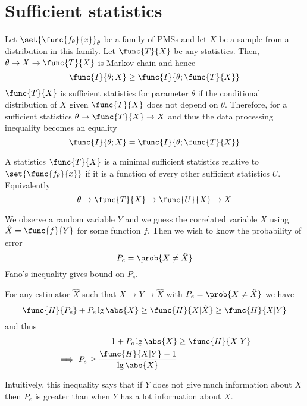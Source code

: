  \section{Sufficient statistics}
 Let \(\set{\func{f_\theta}{x}}_{\theta}\) be a family of PMSs and let \(X\) be a sample from a distribution in this family. Let \(\func{T}{X}\) be any statistics. Then, \(\theta \to X \to \func{T}{X}\) is Markov chain and hence 
 \begin{equation*}
       \func{I}{\theta; X} \geq \func{I}{\theta; \func{T}{X}}
 \end{equation*}
 \(\func{T}{X}\) is sufficient statistics for parameter \(\theta\) if the conditional distribution of \(X\) given \(\func{T}{X}\) does not depend on \(\theta\). Therefore, for a sufficient statistics \(\theta \to \func{T}{X} \to X\) and thus the data processing inequality becomes an equality 
 \begin{equation*}
       \func{I}{\theta ; X} = \func{I}{\theta ; \func{T}{X}}
 \end{equation*}

 A statistics \(\func{T}{X}\) is a minimal sufficient statistics relative to \(\set{\func{f_\theta}{x}}\) if it is a function of every other sufficient statistics \(U\). Equivalently 
 \begin{equation*}
       \theta \to \func{T}{X} \to \func{U}{X} \to X
 \end{equation*}

 We observe a random variable \(Y\) and we guess the correlated variable \(X\) using \(\hat{X} =\func{f}{Y}\) for some function \(f\). Then we wish to know the probability of error 
 \begin{equation*}
       P_e = \prob{X \neq \hat{X}}
 \end{equation*}
 Fano's inequality gives bound on \(P_e\).
 \begin{theorem}
       For any estimator \(\hat{X}\) such that \(X \to Y \to \hat{X}\) with \(P_e = \prob{X \neq \hat{X}}\) we have 
       \begin{equation*}
             \func{H}{P_e} + P_e \lg\abs{X} \geq \func{H}{X|\hat{X}} \geq \func{H}{X|Y}
       \end{equation*}
       and thus 
       \begin{align*}
             1 + P_e \lg\abs{X} &\geq \func{H}{X|Y} \\
             \implies P_e \geq \dfrac{\func{H}{X|Y} - 1}{\lg \abs{X}}
       \end{align*}
 \end{theorem}
 Intuitively, this inequality says that if \(Y\) does not give much information about \(X\) then \(P_e\) is greater than when \(Y\) has a lot information about \(X\).

